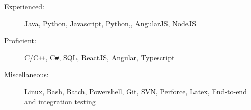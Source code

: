

\begin{description}
\item[Experienced:]
Java, Python, Javascript, Python,, AngularJS, NodeJS
\item[Proficient:]
C/C{}\verb!++!, C{}\verb!#!, SQL, ReactJS, Angular, Typescript
\item[Miscellaneous:]
Linux, Bash, Batch, Powershell, Git, SVN, Perforce, Latex, End-to-end and integration testing
\end{description}